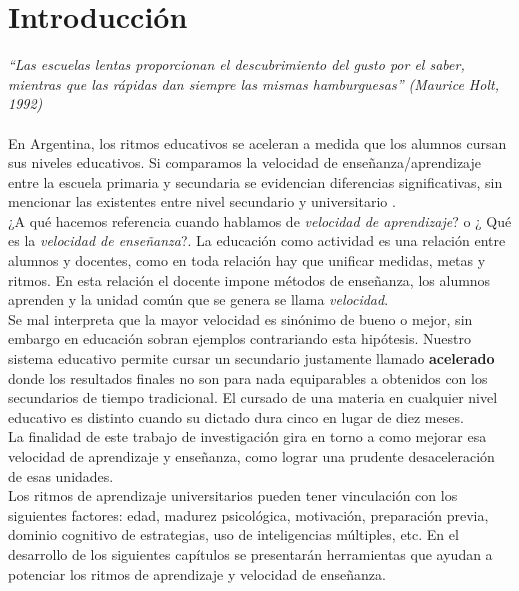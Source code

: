 
\chapter{Introducci\'on}
\textit{``Las escuelas lentas proporcionan el descubrimiento del gusto por el saber, mientras que las r\'apidas dan siempre las mismas hamburguesas'' 
(Maurice Holt, 1992)\\}
\\
En Argentina, los ritmos educativos se aceleran a medida que los alumnos cursan sus niveles educativos. Si comparamos la velocidad de ense\~nanza/aprendizaje 
entre la escuela primaria y secundaria se evidencian diferencias significativas, sin mencionar las existentes entre nivel secundario y universitario .\\
¿A qu\'e hacemos referencia cuando hablamos de \textit{velocidad de aprendizaje}? o ¿ Qu\'e es la \textit{velocidad de ense\~nanza}?. La educaci\'on como 
actividad es una relaci\'on entre alumnos y docentes, como en toda relaci\'on hay que unificar medidas, metas y ritmos. En esta relaci\'on el docente impone 
m\'etodos de ense\~nanza, los alumnos aprenden y la unidad com\'un que se genera se llama \textit{velocidad}.\\
Se mal interpreta que la mayor velocidad es sin\'onimo de bueno o mejor, sin embargo en educaci\'on sobran ejemplos contrariando esta hip\'otesis. Nuestro sistema
educativo permite cursar un secundario justamente llamado \textbf{acelerado} donde los resultados finales no son para nada equiparables a obtenidos con los 
secundarios de tiempo tradicional. El cursado de una materia en cualquier nivel educativo es distinto cuando su dictado dura cinco en lugar de diez meses.\\
La finalidad de este trabajo de investigaci\'on gira en torno a como mejorar esa velocidad de aprendizaje y ense\~nanza, como lograr una prudente desaceleraci\'on
de esas unidades.\\
Los ritmos de aprendizaje universitarios pueden tener vinculaci\'on con los siguientes factores: edad, madurez psicol\'ogica, motivaci\'on, preparaci\'on 
previa, dominio cognitivo de estrategias, uso de inteligencias m\'ultiples, etc. En el desarrollo de los siguientes cap\'itulos se presentar\'an herramientas que 
ayudan a potenciar los ritmos de aprendizaje y velocidad de ense\~nanza.


